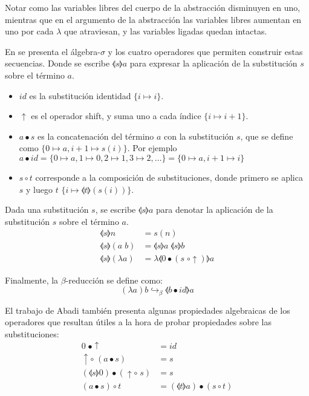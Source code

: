 Notar como las variables libres del cuerpo de la abstracción disminuyen en uno, mientras que en el argumento de la abstracción las variables libres aumentan en uno por cada $\lambda$ que atraviesan, y las variables ligadas quedan intactas.

En \cite{explicit_subs} se presenta el álgebra-$\sigma$ y los cuatro operadores que permiten construir estas secuencias.
Donde se escribe $\llangle s \rrangle a$ para expresar la aplicación de la substitución $s$ sobre el término $a$.

\begin{itemize}
	\item $id$ es la substitución identidad $\{i \mapsto i\}$.
	\item $\uparrow$ es el operador shift, y suma uno a cada índice $\{i \mapsto i+1\}$.
	\item $a \bullet s$ es la concatenación del término $a$ con la substitución $s$, que se define como $\{0 \mapsto a, i+1 \mapsto s(i)\}$. Por ejemplo $a \bullet id = \{ 0 \mapsto a, 1 \mapsto 0, 2 \mapsto 1, 3 \mapsto 2, \dots \} = \{ 0 \mapsto a, i+1 \mapsto i \} $
	\item $s \circ t$ corresponde a la composición de substituciones, donde primero se aplica $s$ y luego $t$ $\{ i \mapsto \llangle t \rrangle (s(i)) \}$.
\end{itemize}

Dada una substitución $s$, se escribe $\llangle s \rrangle a$ para denotar la aplicación de la substitución $s$ sobre el término $a$.
\begin{align*}
	\llangle s \rrangle n &= s(n) \\
	\llangle s \rrangle (a\; b) &= \llangle s \rrangle a\; \llangle s \rrangle b \\
	\llangle s \rrangle (\lambda a) &= \lambda \llangle 0 \bullet (s \; \circ \uparrow) \rrangle a
\end{align*}

Finalmente, la $\beta$-reducción se define como:
\[ (\lambda a)b \hookrightarrow_{\beta} \llangle b \bullet id \rrangle a \]

El trabajo de Abadi también presenta algunas propiedades algebraicas de los operadores que resultan útiles a la hora de probar propiedades sobre las substituciones:
\begin{align*}
	0 \; \bullet \uparrow &= id \\
	\uparrow \circ\; (a \bullet s) &= s \\
	(\llangle s \rrangle 0) \bullet (\uparrow \circ\; s) &= s \\
	(a \bullet s) \circ t &= (\llangle t \rrangle a) \bullet (s \circ t) \\
\end{align*}
 
